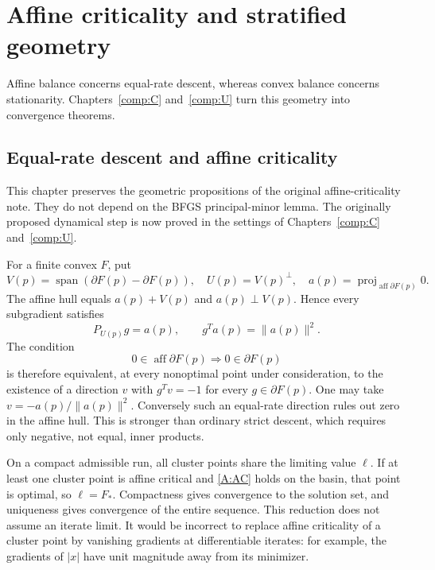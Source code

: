 \chapter{Affine criticality and stratified geometry}\label{comp:A}\label{A:chapter}
\renewcommand{\ModuleTag}{8}
Affine balance concerns equal-rate descent, whereas convex balance concerns stationarity. Chapters~\ref{comp:C} and~\ref{comp:U} turn this geometry into convergence theorems.


\section{Equal-rate descent and affine criticality}

This chapter preserves the geometric propositions of the original affine-criticality note. They do not depend on the BFGS principal-minor lemma. The originally proposed dynamical step is now proved in the settings of Chapters~\ref{comp:C} and~\ref{comp:U}.

For a finite convex $F$, put
\[
 V(p)=\operatorname{span}(\partial F(p)-\partial F(p)),\quad U(p)=V(p)^\perp,
 \quad a(p)=\operatorname{proj}_{\operatorname{aff}\partial F(p)}0.
\]
The affine hull equals $a(p)+V(p)$ and $a(p)\perp V(p)$. Hence every subgradient satisfies
\[
 P_{U(p)}g=a(p),\qquad g^Ta(p)=\|a(p)\|^2.
\]
The condition
\begin{equation}\label{A:AC}
 0\in\operatorname{aff}\partial F(p)\Longrightarrow0\in\partial F(p)
\end{equation}
is therefore equivalent, at every nonoptimal point under consideration, to the existence of a direction $v$ with $g^Tv=-1$ for every $g\in\partial F(p)$. One may take $v=-a(p)/\|a(p)\|^2$. Conversely such an equal-rate direction rules out zero in the affine hull. This is stronger than ordinary strict descent, which requires only negative, not equal, inner products.

On a compact admissible run, all cluster points share the limiting value $\ell$. If at least one cluster point is affine critical and \eqref{A:AC} holds on the basin, that point is optimal, so $\ell=F_*$. Compactness gives convergence to the solution set, and uniqueness gives convergence of the entire sequence. This reduction does not assume an iterate limit. It would be incorrect to replace affine criticality of a cluster point by vanishing gradients at differentiable iterates: for example, the gradients of $|x|$ have unit magnitude away from its minimizer.

